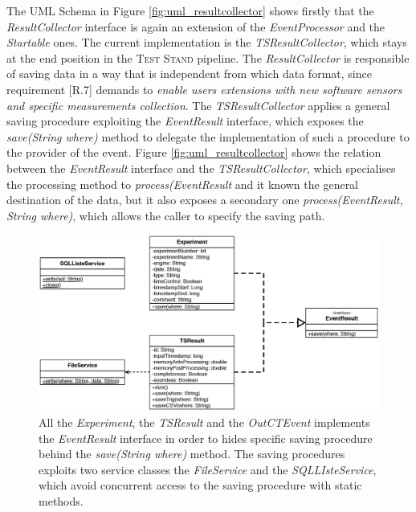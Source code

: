 The UML Schema in Figure \ref{fig:uml_resultcollector} shows firstly that the \textit{ResultCollector} interface is again an extension of the \textit{EventProcessor} and the \textit{Startable} ones. The current implementation is the \textit{TSResultCollector}, which stays at the end position in the \textsc{Test Stand} pipeline. The \textit{ResultCollector} is responsible of saving data in a way that is independent from which data format, since requirement [R.7] demands to \textit{enable users extensions with new software sensors and specific measurements collection}. The \textit{TSResultCollector} applies a general saving procedure exploiting the \textit{EventResult} interface, which exposes the \textit{save(String where)} method to delegate the implementation of such a procedure to the provider of the event. Figure \ref{fig:uml_resultcollector} shows the relation between the \textit{EventResult} interface and the \textit{TSResultCollector}, which specialises the processing method to \textit{process(EventResult} and it known the general destination of the data, but it also exposes a secondary one \textit{process(EventResult, String where)}, which allows the caller to specify the saving path.


\begin{figure}[tbh]
  \centering
	\includegraphics[width=\linewidth]{images/uml_resultcollector_events}
	\caption[\textsc{ResultCollector} Events - UML Schema]{ All the \textit{Experiment}, the \textit{TSResult} and the \textit{OutCTEvent} implements the \textit{EventResult} interface in order to hides specific saving procedure behind the \textit{save(String where)} method. The saving procedures exploits two service classes the \textit{FileService} and the \textit{SQLLIsteService}, which avoid concurrent access to the saving procedure with static methods.} 
  	\label{fig:uml_resultcollector_events}
\end{figure}

